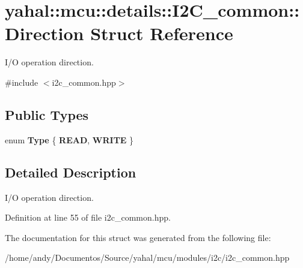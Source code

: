 \hypertarget{structyahal_1_1mcu_1_1details_1_1_i2_c__common_1_1_direction}{}\section{yahal\+:\+:mcu\+:\+:details\+:\+:I2\+C\+\_\+common\+:\+:Direction Struct Reference}
\label{structyahal_1_1mcu_1_1details_1_1_i2_c__common_1_1_direction}


I/\+O operation direction.  




{\ttfamily \#include $<$i2c\+\_\+common.\+hpp$>$}

\subsection*{Public Types}
\begin{DoxyCompactItemize}
\item 
\hypertarget{structyahal_1_1mcu_1_1details_1_1_i2_c__common_1_1_direction_a13e2000f0f779540af7efbc0f744b420}{}enum {\bfseries Type} \{ {\bfseries R\+E\+A\+D}, 
{\bfseries W\+R\+I\+T\+E}
 \}\label{structyahal_1_1mcu_1_1details_1_1_i2_c__common_1_1_direction_a13e2000f0f779540af7efbc0f744b420}

\end{DoxyCompactItemize}


\subsection{Detailed Description}
I/\+O operation direction. 

Definition at line 55 of file i2c\+\_\+common.\+hpp.



The documentation for this struct was generated from the following file\+:\begin{DoxyCompactItemize}
\item 
/home/andy/\+Documentos/\+Source/yahal/mcu/modules/i2c/i2c\+\_\+common.\+hpp\end{DoxyCompactItemize}
